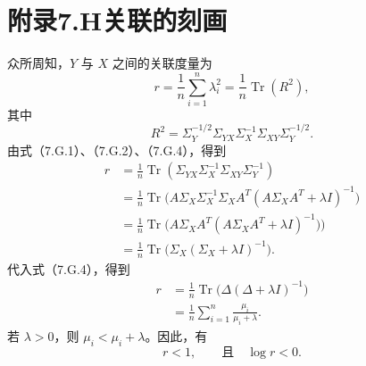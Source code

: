 \section*{附录7.H\quad 关联的刻画}

众所周知，$Y$ 与 $X$ 之间的关联度量为
\begin{equation}
r=\frac1n\sum_{i=1}^n\lambda_i^2=\frac1n\operatorname{Tr}(R^2),\tag{7.H.1}
\end{equation}
其中
\[
R^2=\Sigma_Y^{-1/2}\Sigma_{YX}\Sigma_X^{-1}\Sigma_{XY}\Sigma_Y^{-1/2}.
\]
由式（7.G.1）、（7.G.2）、（7.G.4），得到
\begin{equation}
\begin{aligned}
r&=\frac1n\operatorname{Tr}(\Sigma_{YX}\Sigma_X^{-1}\Sigma_{XY}\Sigma_Y^{-1})\\
 &=\frac1n\operatorname{Tr}\bigl(A\Sigma_X\Sigma_X^{-1}\Sigma_XA^T
  (A\Sigma_XA^T+\lambda I)^{-1}\bigr)\\
 &=\frac1n\operatorname{Tr}\bigl(A\Sigma_XA^T
  (A\Sigma_XA^T+\lambda I)^{-1}\bigr))\\
 &=\frac1n\operatorname{Tr}\bigl(\Sigma_X(\Sigma_X+\lambda I)^{-1}\bigr).
\end{aligned}\tag{7.H.2}
\end{equation}
代入式（7.G.4），得到
\begin{equation}
\begin{aligned}
r&=\frac1n\operatorname{Tr}\bigl(\Delta(\Delta+\lambda I)^{-1}\bigr)\\
 &=\frac1n\sum_{i=1}^n\frac{\mu_i}{\mu_i+\lambda}.
\end{aligned}\tag{7.H3}
\end{equation}
若 $\lambda>0$，则 $\mu_i<\mu_i+\lambda$。因此，有
\[
r<1,\qquad\text{且}\quad\log r<0.
\]
